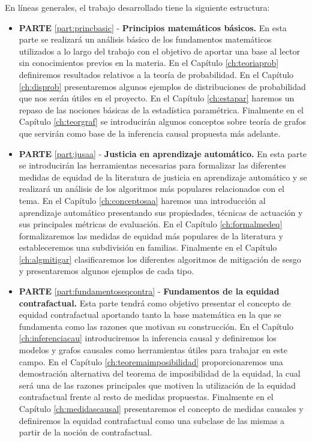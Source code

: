 \documentclass[oneside,openright,titlepage,numbers=noenddot,openany,headinclude,footinclude=true,
cleardoublepage=empty,abstractoff,BCOR=5mm,paper=a4,fontsize=12pt,main=spanish]{scrreprt}
\begin{document}
En líneas generales, el trabajo desarrollado tiene la siguiente estructura:

\begin{itemize}
    \item \textbf{PARTE} \ref{part:princbasic} - \textbf{Principios matemáticos básicos.} En esta parte se realizará un análisis básico de los fundamentos matemáticos utilizados a lo largo del trabajo con el objetivo de aportar una base al lector sin conocimientos previos en la materia. En el Capítulo \ref{ch:teoriaprob} definiremos resultados relativos a la teoría de probabilidad. En el Capítulo \ref{ch:disprob} presentaremos algunos ejemplos de distribuciones de probabilidad que nos serán útiles en el proyecto. En el Capítulo \ref{ch:estapar} haremos un repaso de las nociones básicas de la estadística paramétrica. Finalmente en el Capítulo \ref{ch:teorgraf} se introducirán algunos conceptos sobre teoría de grafos que servirán como base de la inferencia causal propuesta más adelante.\\
    \item \textbf{PARTE} \ref{part:jusaa} - \textbf{Justicia en aprendizaje automático.} En esta parte se introducirán las herramientas necesarias para formalizar las diferentes medidas de equidad de la literatura de justicia en aprendizaje automático y se realizará un análisis de los algoritmos más populares relacionados con el tema. En el Capítulo \ref{ch:conceptosaa} haremos una introducción al aprendizaje automático presentando sus propiedades, técnicas de actuación y sus principales métricas de evaluación. En el Capítulo \ref{ch:formalmedeq} formalizaremos las medidas de equidad más populares de la literatura y estableceremos una subdivisión en familias. Finalmente en el Capítulo \ref{ch:algmitigar} clasificaremos los diferentes algoritmos de mitigación de sesgo y presentaremos algunos ejemplos de cada tipo.\\
    \item \textbf{PARTE} \ref{part:fundamentoseqcontra} - \textbf{Fundamentos de la equidad contrafactual.} Esta parte tendrá como objetivo presentar el concepto de equidad contrafactual aportando tanto la base matemática en la que se fundamenta como las razones que motivan su construcción. En el Capítulo \ref{ch:inferenciacau} introduciremos la inferencia causal y definiremos los modelos y grafos causales como herramientas útiles para trabajar en este campo. En el Capítulo \ref{ch:teoremaimposibilidad} proporcionaremos una demostración alternativa del teorema de imposibilidad de la equidad, la cual será una de las razones principales que motiven la utilización de la equidad contrafactual frente al resto de medidas propuestas. Finalmente en el Capítulo \ref{ch:medidascausal} presentaremos el concepto de medidas causales y definiremos la equidad contrafactual como una subclase de las mismas a partir de la noción de contrafactual.\\

\end{itemize}
\end{document}
